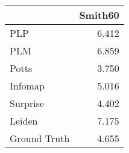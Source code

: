 \begin{tabular}{lr}
\toprule
{} & Smith60 \\
\midrule
PLP          &   6.412 \\
PLM          &   6.859 \\
Potts        &   3.750 \\
Infomap      &   5.016 \\
Surprise     &   4.402 \\
Leiden       &   7.175 \\
Ground Truth &   4.655 \\
\bottomrule
\end{tabular}
